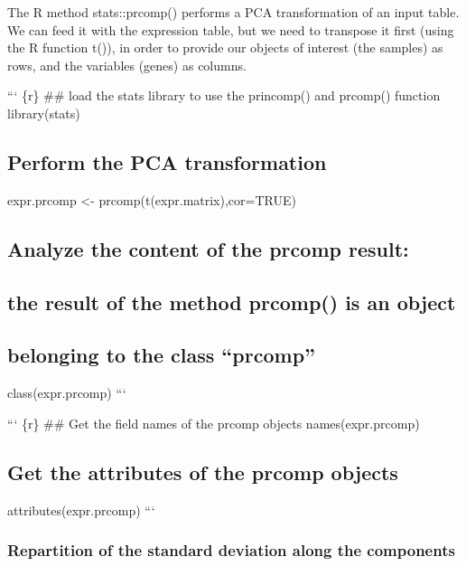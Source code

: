The {R} method stats::prcomp() performs a PCA transformation of an input
table. We can feed it with the expression table, but we need to
transpose it first (using the {R} function t()), in order to provide our
objects of interest (the samples) as rows, and the variables (genes) as
columns.

``` \{r\} \#\# load the stats library to use the princomp() and prcomp()
function library(stats)

\subsection{Perform the PCA
transformation}\label{perform-the-pca-transformation}

expr.prcomp \textless{}- prcomp(t(expr.matrix),cor=TRUE)

\subsection{Analyze the content of the prcomp
result:}\label{analyze-the-content-of-the-prcomp-result}

\subsection{the result of the method prcomp() is an
object}\label{the-result-of-the-method-prcomp-is-an-object}

\subsection{belonging to the class
``prcomp''}\label{belonging-to-the-class-prcomp}

class(expr.prcomp) ```

``` \{r\} \#\# Get the field names of the prcomp objects
names(expr.prcomp)

\subsection{Get the attributes of the prcomp
objects}\label{get-the-attributes-of-the-prcomp-objects}

attributes(expr.prcomp) ```

\subsubsection{Repartition of the standard deviation along the
components}\label{repartition-of-the-standard-deviation-along-the-components}

